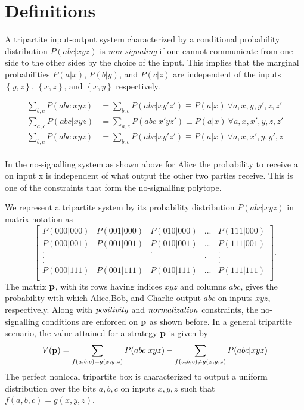 \documentclass[aps,prl,twocolumn,groupedaddress]{revtex4}
\begin{document}
\section{Definitions}

A tripartite input-output system characterized by a conditional probability
distribution $P(abc|xyz)$ is \emph{non-signaling} if one cannot communicate 
from one side to the other sides by the choice of the input. This implies that
the marginal probabilities $P(a|x)$, $P(b|y)$, and $P(c|z)$ are independent of the inputs $\left\{ y,z \right\}$, $\left\{ x,z \right\}$, and $\left\{ x,y \right\}$ respectively. 

\begin{align*}
  \sum_{b,c}P(abc|xyz)&=\sum_{b,c}P(abc|xy'z')\equiv P(a|x)\ \forall a,x,y,y',z,z'\\
  \sum_{a,c}P(abc|xyz)&=\sum_{a,c}P(abc|x'yz')\equiv P(a|x)\ \forall a,x,x',y,z,z'\\
  \sum_{b,c}P(abc|xyz)&=\sum_{b,c}P(abc|xy'z')\equiv P(a|x)\ \forall a,x,x',y,y',z\\
\end{align*}


In the no-signalling system as shown above for Alice the probability to receive a on input x is independent of what output the other two parties receive. This is one of the constraints that form the no-signalling polytope. 



We represent a tripartite system by its probability distribution
$P(abc|xyz)$ in matrix notation as
\[\left[
  \begin{array}{ccccc}
     P(000|000)&P(001|000)&P(010|000)&...&P(111|000)\\
     P(000|001)&P(001|001)&P(010|001)&...&P(111|001)\\
     . &&.&&.\\
     . &&&.&.\\
     . &&&&.\\
     P(000|111)&P(001|111)&P(010|111)&...&P(111|111)\\
  \end{array}\right].
\]
The
matrix ${\bf p}$, with its rows having indices $xyz$ and columns  $abc$,
gives the probability with which Alice,Bob, and Charlie output $abc$ on
inputs $xyz$, respectively.  Along with $\emph{positivity}$ and
$\emph{normalization}$  constraints, the no-signalling conditions are enforced on ${\bf p}$ as shown before.
In a general tripartite scenario, the value
attained for a strategy ${\bf p}$ is given by
\begin{eqnarray}
\label{intro:chsheq}
V({\bf p}) = \sum_{f(a,b,c)= g(x,y,z)}P(abc|xyz) - \sum_{f(a,b,c) \neq g(x,y,z)}P(abc|xyz)
\end{eqnarray}
The perfect nonlocal tripartite box is characterized to output a uniform distribution
over the bits $a,b,c$ on inputs $x,y,z$ such that $f(a,b,c)= g(x,y,z)$.
\end{document}
